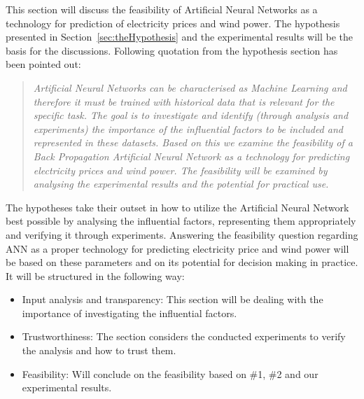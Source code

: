 This section will discuss the feasibility of Artificial Neural Networks as a technology for prediction of electricity prices and wind power. The hypothesis presented in Section~\ref{sec:theHypothesis} and the experimental results will be the basis for the discussions. Following quotation from the hypothesis section has been pointed out:

\begin{quotation}
\textit{Artificial Neural Networks can be characterised as Machine Learning\cite{18} and therefore it must be trained with historical data that is relevant for the specific task. The goal is to investigate and identify (through analysis and experiments) the importance of the influential factors to be included and represented in these datasets. Based on this we examine the feasibility of a Back Propagation Artificial Neural Network as a technology for predicting electricity prices and wind power. The feasibility will be examined by analysing the experimental results and the potential for practical use.}
\end{quotation}

\noindent The hypotheses take their outset in how to utilize the Artificial Neural Network best possible by analysing the influential factors, representing them appropriately and verifying it through experiments. Answering the feasibility question regarding ANN as a proper technology for predicting electricity price and wind power will be based on these parameters and on its potential for decision making in practice. It will be structured in the following way:

\begin{itemize}
\item Input analysis and transparency: This section will be dealing with the importance of investigating the influential factors.
\item Trustworthiness: The section considers the conducted experiments to verify the analysis and how to trust them.
\item Feasibility: Will conclude on the feasibility based on \#1, \#2 and our experimental results.
\end{itemize}

